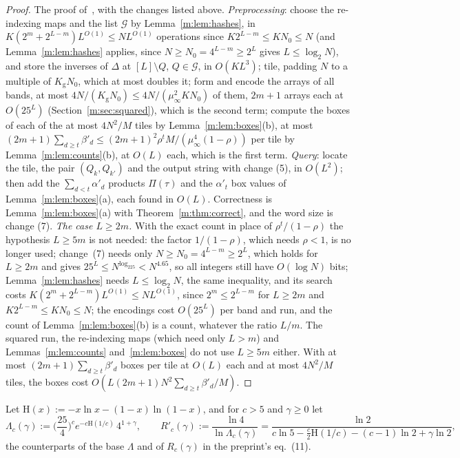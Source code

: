 \documentclass[11pt]{article}
\theoremstyle{definition}
\theoremstyle{remark}
\newcommand{\Hh}{\mathrm{H}}
\newcommand{\Nz}{N_0}
\newcommand{\Qg}{\mathcal{G}}
\newcommand{\Kg}{K_{\mathrm g}}
\begin{document}
\begin{proof}
The proof of~\cite[Theorem 30]{ZT}, with the changes listed above. \emph{Preprocessing}: choose the re-indexing maps and the list $\Qg$ by Lemma~\ref{m:lem:hashes}, in $K(2^m+2^{L-m})L^{O(1)}\le N L^{O(1)}$ operations since $K2^{L-m}\le K\Nz\le N$ (and Lemma~\ref{m:lem:hashes} applies, since $N\ge\Nz=4^{L-m}\ge2^L$ gives $L\le\log_2N$), and store the inverses of $\Delta$ at $[L]\setminus Q$, $Q\in\Qg$, in $O(KL^3)$; tile, padding $N$ to a multiple of $\Kg\Nz$, which at most doubles it; form and encode the arrays of all bands, at most $4N/(\Kg\Nz)\le4N/(\mu_\infty^2 K\Nz)$ of them, $2m+1$ arrays each at $O(25^L)$ (Section~\ref{m:sec:squared}), which is the second term; compute the boxes of each of the at most $4N^2/M$ tiles by Lemma~\ref{m:lem:boxes}(b), at most $(2m+1)\sum_{d\ge t}\beta'_d\le(2m+1)^2\rho^tM/(\mu_\infty^4(1-\rho))$ per tile by Lemma~\ref{m:lem:counts}(b), at $O(L)$ each, which is the first term. \emph{Query}: locate the tile, the pair $(Q_k,Q_{k'})$ and the output string with change (5), in $O(L^2)$; then add the $\sum_{d<t}\alpha'_d$ products $\Pi(\tau)$ and the $\alpha'_t$ box values of Lemma~\ref{m:lem:boxes}(a), each found in $O(L)$. Correctness is Lemma~\ref{m:lem:boxes}(a) with Theorem~\ref{m:thm:correct}, and the word size is change (7).
\emph{The case $L\ge2m$.} With the exact count in place of $\rho^t/(1-\rho)$ the hypothesis $L\ge5m$ is not needed: the factor $1/(1-\rho)$, which needs $\rho<1$, is no longer used; change~(7) needs only $N\ge\Nz=4^{L-m}\ge2^L$, which holds for $L\ge2m$ and gives $25^L\le N^{\log_225}<N^{4.65}$, so all integers still have $O(\log N)$ bits; Lemma~\ref{m:lem:hashes} needs $L\le\log_2N$, the same inequality, and its search costs $K(2^m+2^{L-m})L^{O(1)}\le NL^{O(1)}$, since $2^m\le2^{L-m}$ for $L\ge2m$ and $K2^{L-m}\le K\Nz\le N$; the encodings cost $O(25^L)$ per band and run, and the count of Lemma~\ref{m:lem:boxes}(b) is a count, whatever the ratio $L/m$. The squared run, the re-indexing maps (which need only $L>m$) and Lemmas~\ref{m:lem:counts} and~\ref{m:lem:boxes} do not use $L\ge5m$ either. With at most $(2m+1)\sum_{d\ge t}\beta'_d$ boxes per tile at $O(L)$ each and at most $4N^2/M$ tiles, the boxes cost $O(L(2m+1)N^2\sum_{d\ge t}\beta'_d/M)$.
\end{proof}

Let $\Hh(x):=-x\ln x-(1-x)\ln(1-x)$, and for $c>5$ and $\gamma\ge0$ let
\begin{equation}\label{m:eq:Rc}
\Lambda_c(\gamma):=\Big(\frac{25}{4}\Big)^{c}e^{-c\Hh(1/c)}\,4^{1+\gamma},\qquad
R'_c(\gamma):=\frac{\ln4}{\ln\Lambda_c(\gamma)}=\frac{\ln2}{c\ln5-\frac c2\Hh(1/c)-(c-1)\ln2+\gamma\ln2},
\end{equation}
the counterparts of the base $\Lambda$ and of $R_c(\gamma)$ in the preprint's eq.~(11).
\end{document}
